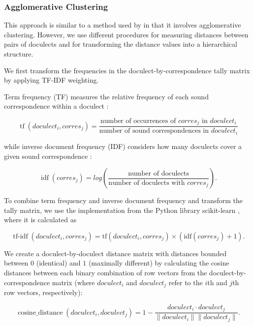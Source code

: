 \documentclass[a4paper]{article}
\begin{document}
\subsubsection{Agglomerative Clustering}
\label{subsubsec:upgma}

This approach is similar to
a method used by \citet{prokic2012detecting}
in that it involves agglomerative clustering.
However, we use different procedures for measuring
distances between pairs of doculects and
for transforming the distance values into a hierarchical structure.

We first transform the frequencies
in the doculect-by-correspondence tally matrix
by applying TF-IDF weighting.

Term frequency (TF) measures the relative frequency
of each sound correspondence within a doculect \citep{luhn1957statistical}:

\begin{equation*}
\operatorname{tf}(doculect_i, corres_j) =
\frac{\text{number of occurrences of } corres_j \text{ in } doculect_i}
{\text{number of sound correspondences in } doculect_i}
\end{equation*}

while inverse document frequency (IDF)
considers how many doculects cover a given
sound correspondence \citep{spaerck1972statistical}:

\begin{equation*}
\operatorname{idf}(corres_j) =
log(
\frac{\text{number of doculects}}
{\text{number of doculects with } corres_j}
).
\end{equation*}

To combine term frequency and inverse document frequency
and transform the tally matrix, 
we use the implementation from the Python library scikit-learn
\citep{pedregosa2011scikit-learn},
where it is calculated as

\begin{equation*}
\operatorname{tf-idf}(doculect_i, corres_j) =
\text{tf}(doculect_i, corres_j)
\times
(
\text{idf}(corres_j)
+ 1).
\end{equation*}

We create a doculect-by-doculect distance matrix
with distances bounded between $0$ (identical) and $1$ (maximally different)
by calculating the cosine distances between each
binary combination of row vectors from the doculect-by-correspondence matrix
(where $doculect_i$ and $doculect_j$ refer to the $i$th and $j$th row vectors, respectively):

\begin{equation*}
\operatorname{cosine\_distance}(doculect_i,doculect_j) =
1 -
\frac{doculect_i \cdot doculect_j}{\lVert doculect_i \rVert \lVert doculect_j \rVert}
.
\end{equation*}
\end{document}
